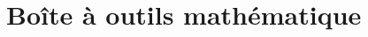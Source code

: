 \documentclass[letterpaper,oneside,french]{book}
\begin{document}


% 


% 
% 
% 
% 
% 
% 
% 
% 
% 


\part{Boîte à outils mathématique}
\label{sec:math}
{\hypersetup{linkcolor=black}
\parttoc
}








\nocite{*}
\newpage
%



\appendix




% 
\end{document}
